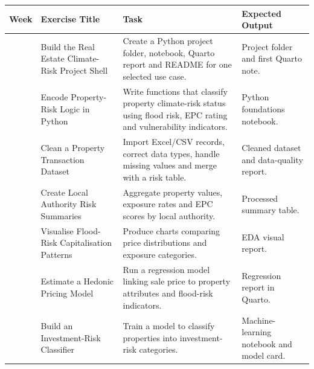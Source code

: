 \documentclass[
  a4paper,
]{article}
\newcounter{none} %
\begin{document}
{\def\LTcaptype{none} %
\begin{longtable}[]{@{}
  >{\raggedleft\arraybackslash}p{}
  >{\raggedright\arraybackslash}p{}
  >{\raggedright\arraybackslash}p{}
  >{\raggedright\arraybackslash}p{}@{}}
\toprule\noalign{}
\begin{minipage}[b]{\linewidth}\raggedleft
Week
\end{minipage} & \begin{minipage}[b]{\linewidth}\raggedright
Exercise Title
\end{minipage} & \begin{minipage}[b]{\linewidth}\raggedright
Task
\end{minipage} & \begin{minipage}[b]{\linewidth}\raggedright
Expected Output
\end{minipage} \\
\midrule\noalign{}
\endhead
\bottomrule\noalign{}
\endlastfoot
1 & Build the Real Estate Climate-Risk Project Shell & Create a Python
project folder, notebook, Quarto report and README for one selected use
case. & Project folder and first Quarto note. \\
2 & Encode Property-Risk Logic in Python & Write functions that classify
property climate-risk status using flood risk, EPC rating and
vulnerability indicators. & Python foundations notebook. \\
3 & Clean a Property Transaction Dataset & Import Excel/CSV records,
correct data types, handle missing values and merge with a risk table. &
Cleaned dataset and data-quality report. \\
4 & Create Local Authority Risk Summaries & Aggregate property values,
exposure rates and EPC scores by local authority. & Processed summary
table. \\
5 & Visualise Flood-Risk Capitalisation Patterns & Produce charts
comparing price distributions and exposure categories. & EDA visual
report. \\
6 & Estimate a Hedonic Pricing Model & Run a regression model linking
sale price to property attributes and flood-risk indicators. &
Regression report in Quarto. \\
7 & Build an Investment-Risk Classifier & Train a model to classify
properties into investment-risk categories. & Machine-learning notebook
and model card. \\

\end{longtable}}
\end{document}
